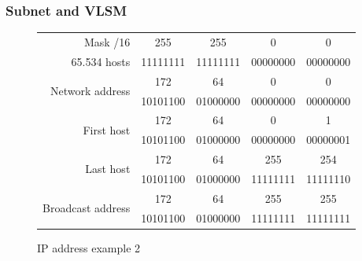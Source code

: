   \begin{frame}
    \frametitle{Subnet and VLSM}
    \begin{figure}
        \centering
      \begin{tabular}{|r|cccc|}
        \hline
        Mask {\color{brown}/16} & {\color{brown}255} & {\color{brown}255} & {\color{fuchsia}0} & {\color{fuchsia}0} \\
        65.534 {\color{blue}hosts} & {\color{brown}11111111} & {\color{brown}11111111} & {\color{fuchsia}00000000} & {\color{fuchsia}00000000} \\ \hline
        \multirow{2}{*}{Network address} & \color{ForestGreen}172 & \color{ForestGreen}64 & \color{blue}0 & \color{blue}0 \\
        & \color{ForestGreen}10101100 & \color{ForestGreen}01000000 & \color{blue}00000000 & \color{blue}00000000 \\ \hline
        \multirow{2}{*}{First host} & \color{ForestGreen}172 & \color{ForestGreen}64 & \color{blue}0 & \color{blue}1 \\
        & \color{ForestGreen}10101100 & \color{ForestGreen}01000000 & \color{blue}00000000 & \color{blue}00000001 \\ \hline
        \multirow{2}{*}{Last host} & \color{ForestGreen}172 & \color{ForestGreen}64 & \color{blue}255 & \color{blue}254 \\
        & \color{ForestGreen}10101100 & \color{ForestGreen}01000000 & \color{blue}11111111 & \color{blue}11111110 \\ \hline
        \multirow{2}{*}{Broadcast address} & \color{ForestGreen}172 & \color{ForestGreen}64 & \color{blue}255 & \color{blue}255 \\
        & \color{ForestGreen}10101100 & \color{ForestGreen}01000000 & \color{blue}11111111 & \color{blue}11111111 \\ \hline
      \end{tabular}
      \caption{IP address example 2}
    \end{figure}
  \end{frame}


